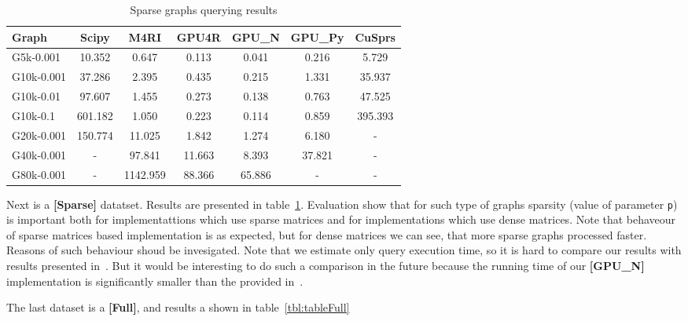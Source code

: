 {\setlength{\tabcolsep}{0.4em}
\begin{table}[H]
\caption{Sparse graphs querying results}
\label{tbl:tableSparse}
\begin{tabular}{| l | c | c | c | c | c | c | }
    \hline
    Graph              & Scipy   & M4RI     & GPU4R  & GPU\_N & GPU\_Py & CuSprs  \\
    \hline
    \hline
    \small{G5k-0.001}  & 10.352  & 0.647    & 0.113  & 0.041  & 0.216   & 5.729   \\
    \small{G10k-0.001} & 37.286  & 2.395    & 0.435  & 0.215  & 1.331   & 35.937  \\
    \small{G10k-0.01}  & 97.607  & 1.455    & 0.273  & 0.138  & 0.763   & 47.525  \\
    \small{G10k-0.1}   & 601.182 & 1.050    & 0.223  & 0.114  & 0.859   & 395.393 \\
    \small{G20k-0.001} & 150.774 & 11.025   & 1.842  & 1.274  & 6.180   & -       \\
    \small{G40k-0.001} & -       & 97.841   & 11.663 & 8.393  & 37.821  & -       \\
    \small{G80k-0.001} & -       & 1142.959 & 88.366 & 65.886 & -       & -       \\
    \hline
  \end{tabular}
\end{table}
}

Next is a \textbf{[Sparse]} datatset.
Results are presented in table~\ref{tbl:tableSparse}.
Evaluation show that for such type of graphs sparsity (value of parameter \texttt{p}) is important both for implementattions which use sparse matrices and for implementations which use dense matrices.
Note that behaveour of sparse matrices based implementation is as expected, but for dense matrices we can see, that more sparse graphs processed faster. 
Reasons of such behaviour shoud be invesigated.
Note that we estimate only query execution time, so it is hard to compare our results with results presented in~\cite{fan2018scaling}.
But it would be interesting to do such a comparison in the future because the running time of our \textbf{[GPU\_N]} implementation is significantly smaller than the provided in~\cite{fan2018scaling}.

The last dataset is a \textbf{[Full]}, and results a shown in table~\ref{tbl:tableFull}


